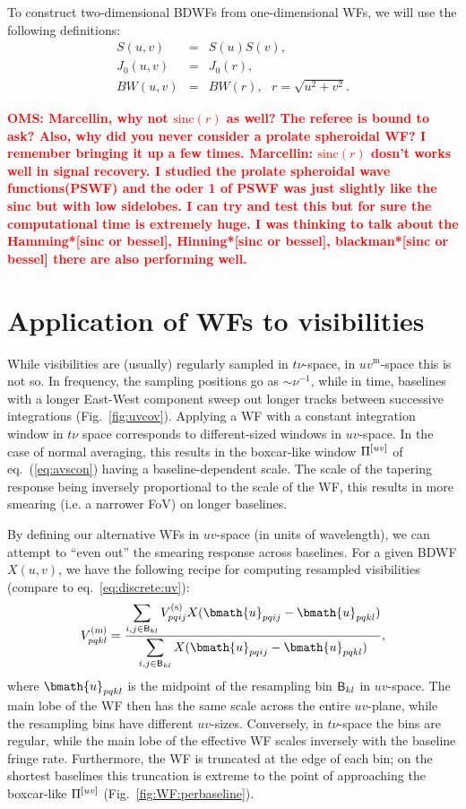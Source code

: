 \documentclass[useAMS,usenatbib]{mn2e}
\newcommand{\OMS}[1]{\textcolor{red}{{\bf OMS: #1}}}
\begin{document}
To construct two-dimensional BDWFs from one-dimensional WFs, we will use the following definitions:
\begin{eqnarray}
S(u,v) &=& S(u)S(v), \nonumber\\
J_0(u,v) &=& J_0(r), \nonumber\\
BW(u,v) &=& BW(r),~~~r=\sqrt{u^2+v^2}.
\end{eqnarray}

\OMS{Marcellin, why not $\mathrm{sinc}(r)$ as well? The referee is bound to ask? Also, why did you never consider a 
prolate spheroidal WF? I remember bringing it up a few times. Marcellin: $\mathrm{sinc}(r)$ dosn't works well in signal recovery. I studied the prolate spheroidal wave functions(PSWF)
and the oder 1 of PSWF was just slightly like the sinc but with low sidelobes. I can try and test this but for sure 
the computational time is extremely huge. I was thinking to talk about 
the Hamming*[sinc or bessel], Hinning*[sinc or bessel], blackman*[sinc or bessel] there are also performing well.}

\section{Application of WFs to visibilities}

While visibilities are (usually) regularly sampled in $t\nu$-space, in $uv^\mathrm{m}$-space this is not so. In frequency, 
the sampling positions go as $\sim\nu^{-1}$, while in time, baselines with a longer East-West component sweep out longer tracks between successive 
integrations (Fig.~\ref{fig:uvcov}). Applying a WF with a constant integration window in $t\nu$ space corresponds to 
different-sized windows in $uv$-space. In the case of normal averaging, this results in the boxcar-like window $\Pi^{[uv]}$ of 
eq.~(\ref{eq:avscon}) having a baseline-dependent scale. The scale of the tapering response being inversely proportional to 
the scale of the WF, this results in more smearing (i.e. a narrower FoV) on longer baselines.

By defining our alternative WFs in $uv$-space (in units of wavelength), we can attempt to ``even out'' the smearing 
response across baselines. For a given BDWF $X(u,v)$, we have the following recipe 
for computing resampled visibilities (compare to eq.~\ref{eq:discrete:uv}):
\begin{equation}
\label{eq:avg:wf}
V^\mathrm{(m)}_{pqkl} = \frac{\displaystyle\sum\limits_{{i,j}\in \Bij_{kl}} \Vs_{pqij} X(\bmath{u}_{pqij}-\bmath{u}_{pqkl})}
{\displaystyle\sum\limits_{{i,j}\in \Bij_{kl}} X(\bmath{u}_{pqij}-\bmath{u}_{pqkl})},
\end{equation}
where $\bmath{u}_{pqkl}$ is the midpoint of the resampling bin $\mathsf{B}_{kl}$ in $uv$-space. The main lobe of the WF then 
has the same scale across the entire $uv$-plane, while the resampling bins have different $uv$-sizes. Conversely, in 
$t\nu$-space the bins
are regular, while the main lobe of the effective WF scales inversely with the baseline fringe rate. Furthermore, 
the WF is truncated at the edge of each bin; on the shortest baselines this truncation is extreme to the 
point of approaching the boxcar-like $\Pi^{[uv]}$ (Fig.~\ref{fig:WF:perbaseline}).
\end{document}
